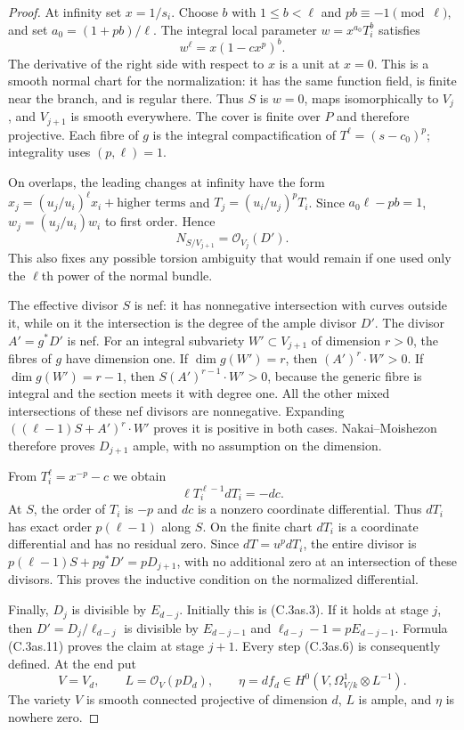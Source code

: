 \begin{proof}
At infinity set $x=1/s_i$. Choose $b$ with
$1\le b<\ell$ and $pb\equiv-1\pmod\ell$, and set
$a_0=(1+pb)/\ell$. The integral local parameter
$w=x^{a_0}T_i^b$ satisfies
\[
                    w^\ell=x(1-cx^p)^b.
 \tag{C.3as.13}
\]
The derivative of the right side with respect to $x$ is a unit
at $x=0$. This is a smooth normal chart for the normalization:
it has the same function field, is finite near the branch, and
is regular there. Thus $S$ is $w=0$, maps isomorphically to
$V_j$, and $V_{j+1}$ is smooth everywhere. The cover is finite
over $P$ and therefore projective. Each fibre of $g$ is the
integral compactification of $T^\ell=(s-c_0)^p$; integrality
uses $(p,\ell)=1$.

On overlaps, the leading changes at infinity have the form
$x_j=(u_j/u_i)^\ell x_i+\text{higher terms}$ and
$T_j=(u_i/u_j)^pT_i$. Since $a_0\ell-pb=1$,
$w_j=(u_j/u_i)w_i$ to first order. Hence
\[
                         N_{S/V_{j+1}}=\mathcal O_{V_j}(D').
 \tag{C.3as.14}
\]
This also fixes any possible torsion ambiguity that would remain
if one used only the $\ell$th power of the normal bundle.

The effective divisor $S$ is nef: it has nonnegative intersection
with curves outside it, while on it the intersection is the degree
of the ample divisor $D'$. The divisor $A'=g^*D'$ is nef.
For an integral subvariety $W'\subset V_{j+1}$ of dimension $r>0$,
the fibres of $g$ have dimension one. If $\dim g(W')=r$,
then $(A')^r\cdot W'>0$. If $\dim g(W')=r-1$,
then $S(A')^{r-1}\cdot W'>0$, because the generic fibre is
integral and the section meets it with degree one. All the
other mixed intersections of these nef divisors are nonnegative.
Expanding $((\ell-1)S+A')^r\cdot W'$ proves it is positive
in both cases. Nakai--Moishezon therefore proves $D_{j+1}$
ample, with no assumption on the dimension.

From $T_i^\ell=x^{-p}-c$ we obtain
\[
                    \ell T_i^{\ell-1}dT_i=-dc .
 \tag{C.3as.15}
\]
At $S$, the order of $T_i$ is $-p$ and $dc$ is a nonzero
coordinate differential. Thus $dT_i$ has exact order
$p(\ell-1)$ along $S$. On the finite chart $dT_i$ is a
coordinate differential and has no residual zero. Since
$dT=u^p dT_i$, the entire divisor is
$p(\ell-1)S+pg^*D'=pD_{j+1}$, with no additional zero
at an intersection of these divisors. This proves the inductive
condition on the normalized differential.

Finally, $D_j$ is divisible by $E_{d-j}$. Initially this is
(C.3as.3). If it holds at stage $j$, then $D'=D_j/\ell_{d-j}$
is divisible by $E_{d-j-1}$ and
$\ell_{d-j}-1=pE_{d-j-1}$. Formula (C.3as.11) proves the
claim at stage $j+1$. Every step (C.3as.6) is consequently
defined. At the end put
\[
               V=V_d,\qquad L=\mathcal O_V(pD_d),
               \qquad
               \eta=df_d\in H^0(V,\Omega^1_{V/k}\otimes L^{-1}).
 \tag{C.3as.16}
\]
The variety $V$ is smooth connected projective of dimension $d$,
$L$ is ample, and $\eta$ is nowhere zero.


\end{proof}

